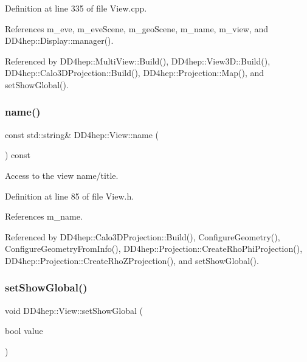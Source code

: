 Definition at line 335 of file View.\+cpp.



References m\+\_\+eve, m\+\_\+eve\+Scene, m\+\_\+geo\+Scene, m\+\_\+name, m\+\_\+view, and D\+D4hep\+::\+Display\+::manager().



Referenced by D\+D4hep\+::\+Multi\+View\+::\+Build(), D\+D4hep\+::\+View3\+D\+::\+Build(), D\+D4hep\+::\+Calo3\+D\+Projection\+::\+Build(), D\+D4hep\+::\+Projection\+::\+Map(), and set\+Show\+Global().

\hypertarget{class_d_d4hep_1_1_view_ae369eadf16399a6bf34f1ce491b7a788}{}\label{class_d_d4hep_1_1_view_ae369eadf16399a6bf34f1ce491b7a788} 
\subsubsection{\texorpdfstring{name()}{name()}}
{\footnotesize\ttfamily const std\+::string\& D\+D4hep\+::\+View\+::name (\begin{DoxyParamCaption}{ }\end{DoxyParamCaption}) const\hspace{0.3cm}{\ttfamily [inline]}}



Access to the view name/title. 



Definition at line 85 of file View.\+h.



References m\+\_\+name.



Referenced by D\+D4hep\+::\+Calo3\+D\+Projection\+::\+Build(), Configure\+Geometry(), Configure\+Geometry\+From\+Info(), D\+D4hep\+::\+Projection\+::\+Create\+Rho\+Phi\+Projection(), D\+D4hep\+::\+Projection\+::\+Create\+Rho\+Z\+Projection(), and set\+Show\+Global().

\hypertarget{class_d_d4hep_1_1_view_a76019e28799e7a10d7678a251edb198d}{}\label{class_d_d4hep_1_1_view_a76019e28799e7a10d7678a251edb198d} 
\subsubsection{\texorpdfstring{set\+Show\+Global()}{setShowGlobal()}}
{\footnotesize\ttfamily void D\+D4hep\+::\+View\+::set\+Show\+Global (\begin{DoxyParamCaption}\item[{bool}]{value }\end{DoxyParamCaption})\hspace{0.3cm}{\ttfamily [inline]}}



